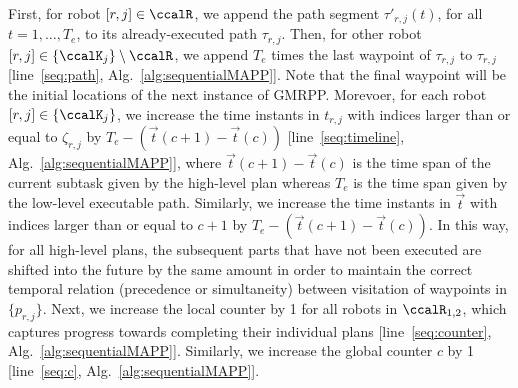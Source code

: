 \documentclass[Afour,sageh,times]{sagej}
\newcommand{\vertex}[1]{v_{\textup{#1}}}
\begin{document}
{{{%

First, for robot $[r, j] \in \ccalR$, we append the path segment $\tau'_{r,j}(t)$, for all $t=1,\ldots, T_e$, to its already-executed path $\tau_{r,j}$. Then, for other robot $[r,j] \in \{\ccalK_j\}\setminus \ccalR$, we  append  $T_e$ times the last waypoint of  $\tau_{r,j}$  to $\tau_{r,j}$ [line~\ref{seq:path}, Alg.~\ref{alg:sequentialMAPP}]. Note that the final waypoint will be the initial locations of the next instance of GMRPP.  Morevoer, for each robot $[r,j] \in \{\ccalK_j\}$, we increase the time instants in $t_{r,j}$ with indices larger than or equal to  $\zeta_{r,j}$ by $T_e - (\vec{t}(c+1) - \vec{t}(c))$ [line~\ref{seq:timeline}, Alg.~\ref{alg:sequentialMAPP}], where $\vec{t}(c+1) - \vec{t}(c)$ is the time span of the current subtask  given by the high-level plan whereas $T_e$ is the time span given by the low-level executable path.
    Similarly, we increase the time instants in $\vec{t}$ with indices larger than or equal to  $c+1$ by $T_e - (\vec{t}(c+1)- \vec{t}(c))$.
    In this way, for all high-level plans, the subsequent parts that have not been executed are shifted into the future by the same amount in order to maintain the correct temporal relation (precedence or simultaneity) between visitation of waypoints in $\{p_{r,j}\}$. Next, we increase  the local counter by 1 for all robots in $\ccalR_{1,2}$, which captures progress towards completing their individual plans [line~\ref{seq:counter}, Alg.~\ref{alg:sequentialMAPP}]. Similarly, we increase the global counter $c$ by 1 [line~\ref{seq:c}, Alg.~\ref{alg:sequentialMAPP}].}


}}
\end{document}
